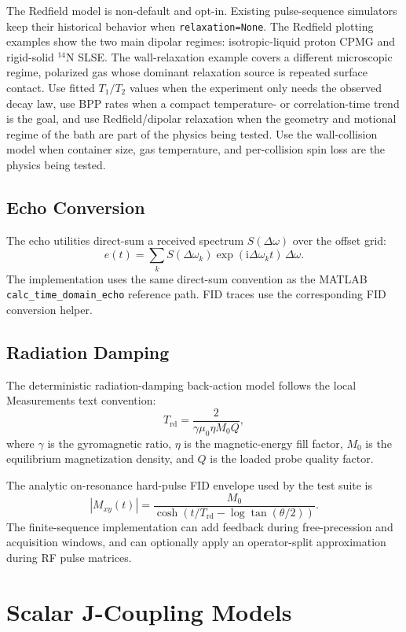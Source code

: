 \documentclass[11pt,oneside]{report}
\newcommand{\code}[1]{\texttt{#1}}
\newcommand{\ii}{\mathrm{i}}
\begin{document}
The Redfield model is non-default and opt-in. Existing pulse-sequence
simulators keep their historical behavior when \code{relaxation=None}. The
Redfield plotting examples show the two main dipolar regimes: isotropic-liquid
proton CPMG and rigid-solid \({}^{14}\mathrm{N}\) SLSE. The wall-relaxation
example covers a different microscopic regime, polarized gas whose dominant
relaxation source is repeated surface contact.
Use fitted \(T_1/T_2\) values when the experiment only needs the observed decay
law, use BPP rates when a compact temperature- or correlation-time trend is the
goal, and use Redfield/dipolar relaxation when the geometry and motional regime
of the bath are part of the physics being tested. Use the wall-collision model
when container size, gas temperature, and per-collision spin loss are the
physics being tested.

\section{Echo Conversion}

The echo utilities direct-sum a received spectrum \(S(\Delta\omega)\) over the
offset grid:
\[
  e(t) =
    \sum_k S(\Delta\omega_k)
    \exp(\ii \Delta\omega_k t)\,\Delta\omega .
\]
The implementation uses the same direct-sum convention as the MATLAB
\code{calc\_time\_domain\_echo} reference path. FID traces use the corresponding
FID conversion helper.

\section{Radiation Damping}

The deterministic radiation-damping back-action model follows the local
Measurements text convention:
\[
  T_{\mathrm{rd}} =
    \frac{2}{\gamma \mu_0 \eta M_0 Q},
\]
where \(\gamma\) is the gyromagnetic ratio, \(\eta\) is the magnetic-energy fill
factor, \(M_0\) is the equilibrium magnetization density, and \(Q\) is the
loaded probe quality factor.

The analytic on-resonance hard-pulse FID envelope used by the test suite is
\[
  |M_{xy}(t)| =
    \frac{M_0}
    {\cosh\left(t/T_{\mathrm{rd}} - \log \tan(\theta/2)\right)}.
\]
The finite-sequence implementation can add feedback during free-precession and
acquisition windows, and can optionally apply an operator-split approximation
during RF pulse matrices.

\chapter{Scalar J-Coupling Models}
\label{chap:jcoupling}
\end{document}
